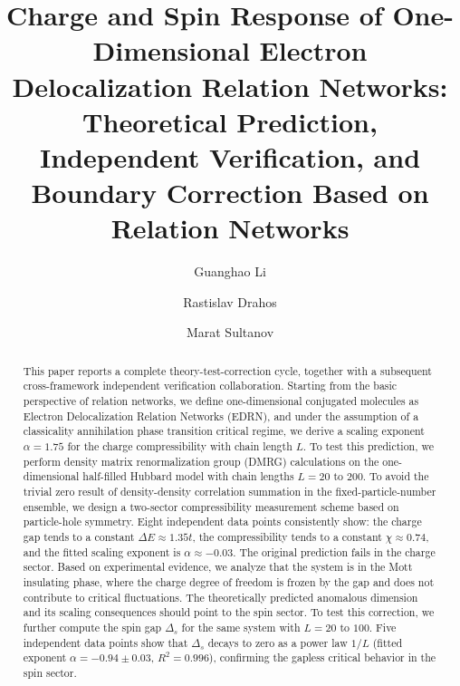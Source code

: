 \documentclass[prb,reprint,twocolumn,superscriptaddress]{revtex4-2}
\begin{document}
\title{Charge and Spin Response of One-Dimensional Electron Delocalization Relation Networks:
Theoretical Prediction, Independent Verification, and Boundary Correction Based on Relation Networks}

\author{Guanghao Li}
\author{Rastislav Drahos}
\author{Marat Sultanov}

\begin{abstract}
This paper reports a complete theory-test-correction cycle, together with a subsequent cross-framework independent verification collaboration. Starting from the basic perspective of relation networks, we define one-dimensional conjugated molecules as Electron Delocalization Relation Networks (EDRN), and under the assumption of a classicality annihilation phase transition critical regime, we derive a scaling exponent $\alpha = 1.75$ for the charge compressibility with chain length $L$. To test this prediction, we perform density matrix renormalization group (DMRG) calculations on the one-dimensional half-filled Hubbard model with chain lengths $L = 20$ to $200$. To avoid the trivial zero result of density-density correlation summation in the fixed-particle-number ensemble, we design a two-sector compressibility measurement scheme based on particle-hole symmetry. Eight independent data points consistently show: the charge gap tends to a constant $\Delta E \approx 1.35t$, the compressibility tends to a constant $\chi \approx 0.74$, and the fitted scaling exponent is $\alpha \approx -0.03$. The original prediction fails in the charge sector. Based on experimental evidence, we analyze that the system is in the Mott insulating phase, where the charge degree of freedom is frozen by the gap and does not contribute to critical fluctuations. The theoretically predicted anomalous dimension and its scaling consequences should point to the spin sector. To test this correction, we further compute the spin gap $\Delta_s$ for the same system with $L = 20$ to $100$. Five independent data points show that $\Delta_s$ decays to zero as a power law $1/L$ (fitted exponent $\alpha = -0.94 \pm 0.03$, $R^2 = 0.996$), confirming the gapless critical behavior in the spin sector.


\end{abstract}
\end{document}
